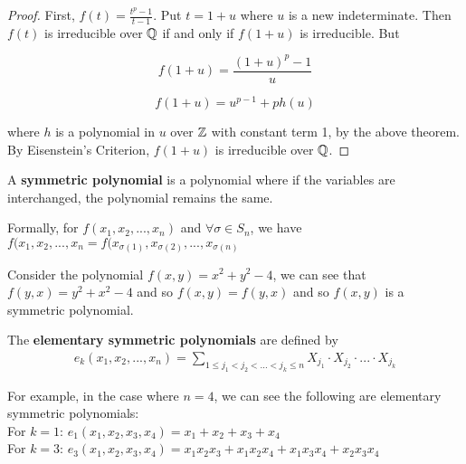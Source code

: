\begin{proof}
First, $f(t) = \frac{t^p - 1}{t - 1}$. Put $t = 1 + u$ where $u$ is a new indeterminate. Then $f(t)$ is irreducible over $\mathbb Q$ if and only if $f(1+u)$ is irreducible. But

$$
f(1+u) = \frac{(1+u)^p - 1}{u}
$$

$$
f(1+u) = u^{p-1} + ph(u)
$$

where $h$ is a polynomial in $u$ over $\mathbb Z$ with constant term 1, by the above theorem. By Eisenstein's Criterion, $f(1+u)$ is irreducible over $\mathbb Q$.
\end{proof}

\begin{definition}
    A \textbf{symmetric polynomial} is a polynomial where if the variables are interchanged, the polynomial remains the same.

    Formally, for $f(x_1,x_2,...,x_n)$ and $\forall \sigma \in S_n$, we have $f(x_1,x_2,...,x_n = f(x_{\sigma(1)},x_{\sigma(2)},...,x_{\sigma(n)}$
\end{definition}

\begin{example}
    Consider the polynomial 
    $f(x,y)=x^2+y^2-4$, we can see that $f(y,x)=y^2+x^2-4$ and so $f(x,y)=f(y,x)$ and so $f(x,y)$ is a symmetric polynomial.
\end{example}

\begin{definition}
    The \textbf{elementary symmetric polynomials} are defined by 
    \begin{align*}
    e_k(x_1,x_2,...,x_n) = \sum_{1\leq j_1<j_2<...<j_k\leq n} X_{j_1}\cdot X_{j_2} \cdot ... \cdot X_{j_k}
    \end{align*}
\end{definition}

\begin{example}
    For example, in the case where $n=4$, we can see the following are elementary symmetric polynomials:
    \\For $k=1$: $e_1(x_1,x_2,x_3,x_4) = x_1 + x_2 + x_3 + x_4$
    \\For $k=3$: $e_3(x_1,x_2,x_3,x_4) = x_1x_2x_3+x_1x_2x_4+x_1x_3x_4+x_2x_3x_4$
\end{example}
